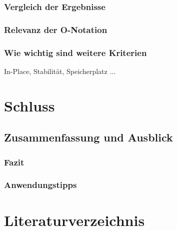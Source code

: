 \documentclass{article}
\begin{document}
\subsubsection{Vergleich der Ergebnisse}
\subsubsection{Relevanz der O-Notation}
\subsubsection{Wie wichtig sind weitere Kriterien}
In-Place, Stabilität, Speicherplatz ...

\section{Schluss}
\subsection{Zusammenfassung und Ausblick}
\subsubsection{Fazit}
\subsubsection{Anwendungstipps}

\section{Literaturverzeichnis}

%



\end{document}

